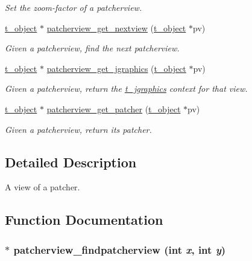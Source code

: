 \begin{DoxyCompactItemize}
\begin{DoxyCompactList}\small\item\em Set the zoom-\/factor of a patcherview. \item\end{DoxyCompactList}\item 
\hyperlink{structt__object}{t\_\-object} $\ast$ \hyperlink{group__jpatcherview_ga37810ea052b4ecd3598cd687666c8841}{patcherview\_\-get\_\-nextview} (\hyperlink{structt__object}{t\_\-object} $\ast$pv)
\begin{DoxyCompactList}\small\item\em Given a patcherview, find the next patcherview. \item\end{DoxyCompactList}\item 
\hyperlink{structt__object}{t\_\-object} $\ast$ \hyperlink{group__jpatcherview_ga221544b77a5371897c96f2e94ae49c82}{patcherview\_\-get\_\-jgraphics} (\hyperlink{structt__object}{t\_\-object} $\ast$pv)
\begin{DoxyCompactList}\small\item\em Given a patcherview, return the \hyperlink{group__jgraphics_ga4bf27bd7e21a59a427481b909d4656e7}{t\_\-jgraphics} context for that view. \item\end{DoxyCompactList}\item 
\hyperlink{structt__object}{t\_\-object} $\ast$ \hyperlink{group__jpatcherview_ga056a0684b79a940b8ee71145d9f77223}{patcherview\_\-get\_\-patcher} (\hyperlink{structt__object}{t\_\-object} $\ast$pv)
\begin{DoxyCompactList}\small\item\em Given a patcherview, return its patcher. \item\end{DoxyCompactList}\end{DoxyCompactItemize}


\subsection{Detailed Description}
A view of a patcher. 

\subsection{Function Documentation}
\hypertarget{group__jpatcherview_ga143a54662c1dea4f8170c7b62bc4cb2d}{
\subsubsection[{patcherview\_\-findpatcherview}]{$\ast$ patcherview\_\-findpatcherview (int {\em x}, \/  int {\em y})}}
\label{group__jpatcherview_ga143a54662c1dea4f8170c7b62bc4cb2d}


